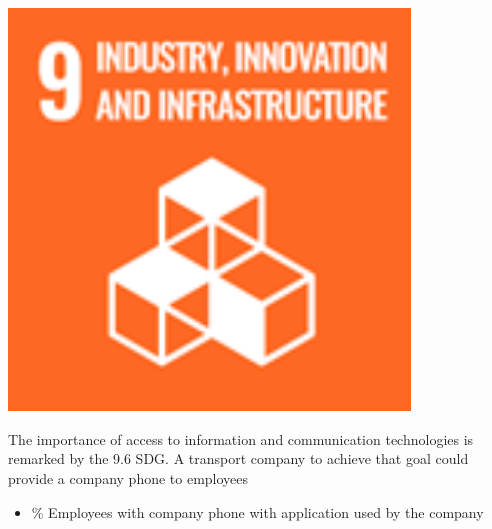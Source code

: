 \begin{minipage}[c]{0.2\textwidth}
    \includegraphics[width=0.8\textwidth]{Images/Social_sustainability/9_industry.png}
\end{minipage}
\begin{minipage}[c]{0.8\textwidth}
The importance of access to information and communication technologies is remarked by the 9.6 SDG. A transport company to achieve that goal could provide a company phone to employees

\begin{itemize}
    \item \% Employees with company phone with application used by the company
\end{itemize}
\end{minipage}

